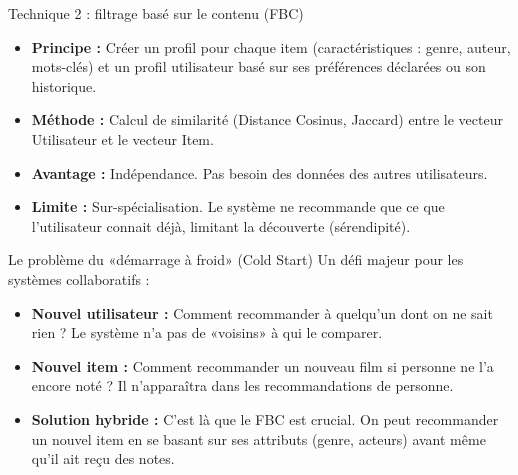 \documentclass[9pt, aspectratio=169]{beamer}
\begin{document}
\begin{frame}{Technique 2 : filtrage basé sur le contenu (FBC)}
    \begin{itemize}
        \item \textbf{Principe :} Créer un profil pour chaque item (caractéristiques : genre, auteur, mots-clés) et un profil utilisateur basé sur ses préférences déclarées ou son historique.
        \item \textbf{Méthode :} Calcul de similarité (Distance Cosinus, Jaccard) entre le vecteur Utilisateur et le vecteur Item.
        \item \textbf{Avantage :} Indépendance. Pas besoin des données des autres utilisateurs.
        \item \textbf{Limite :} Sur-spécialisation. Le système ne recommande que ce que l'utilisateur connait déjà, limitant la découverte (sérendipité).
    \end{itemize}
\end{frame}

\begin{frame}{Le problème du «démarrage à froid» (Cold Start)}
    Un défi majeur pour les systèmes collaboratifs \parencite{Ko2022} :
    \begin{itemize}
        \item \textbf{Nouvel utilisateur :} Comment recommander à quelqu'un dont on ne sait rien ? Le système n'a pas de «voisins» à qui le comparer.
        \item \textbf{Nouvel item :} Comment recommander un nouveau film si personne ne l'a encore noté ? Il n'apparaîtra dans les recommandations de personne.
        \item \textbf{Solution hybride :} C'est là que le FBC est crucial. On peut recommander un nouvel item en se basant sur ses attributs (genre, acteurs) avant même qu'il ait reçu des notes.
    \end{itemize}
\end{frame}
\end{document}
